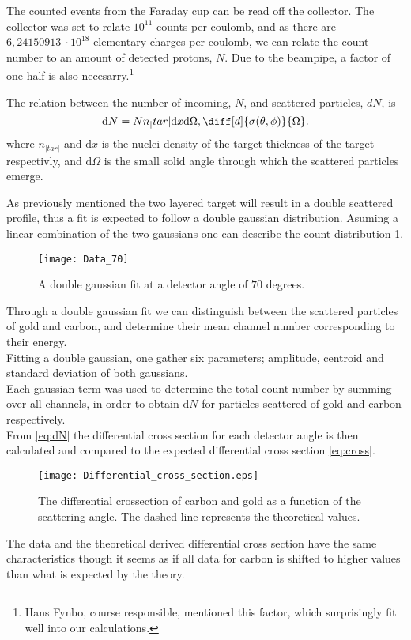 The counted events from the Faraday cup can be read off the collector. 
The collector was set to relate $10^{11}$ counts per coulomb, and as there are
$6,24150913\ \cdot10^{18}$ elementary
charges per coulomb, we can relate the count number to an amount of detected
protons, $N$. Due to the beampipe, a factor of one half is also
necesarry.\footnote{Hans Fynbo, course responsible, mentioned this factor,
    which surprisingly fit well into our calculations.}

The relation between the number of incoming, $N$, and scattered particles, $dN$, is
\begin{equation}\label{eq:dN}
    \mathrm{d}N = N n_|tar| \mathrm{d}x \mathrm{d}\Omega,
    \diff[d]{\sigma(\theta,\phi)}{\Omega}.
\end{equation}
\parencite[eq. 14.42, p. 582]{taylor} where $n_|tar|$ and $\mathrm{d}x$ is the
nuclei density of the target thickness of the target respectivly, and
$\mathrm{d}\Omega$ is the small solid angle through which the scattered
particles emerge.

As previously mentioned  the two layered target will result in a double
scattered profile, thus a fit is expected to follow a double gaussian
distribution. Asuming a linear combination of the two gaussians one can
describe the count distribution \cref{fig_doublegauss}.\\
\begin{figure}[h]
\centering
\texttt{[image: Data\_70]}
\caption{A double gaussian fit at a detector angle of $70$ degrees.}
\label{fig_doublegauss}
\end{figure}
Through a double gaussian fit we can distinguish between the scattered particles of gold and carbon, and determine their mean channel number corresponding to their energy.  \\
Fitting a double gaussian, one gather six parameters; amplitude, centroid and standard deviation
of both gaussians.  \\
Each gaussian term was used to determine the total count number by summing over
all channels, in order to obtain $\mathrm{d}N$ for particles scattered of gold
and carbon respectively.\\
%
From \cref{eq:dN} the differential cross section for each detector angle is
then calculated and compared to the expected differential cross section
\cref{eq:cross}.\\
\begin{figure}[b]
	\centering
		\texttt{[image: Differential\_cross\_section.eps]}
	\caption{The differential crossection  of carbon and gold as a function of the scattering angle. The dashed line represents the theoretical values.}
	\label{fig:Differential_cross_section}
\end{figure}
The data and the theoretical derived differential cross section have the same
characteristics though it seems as if all data for carbon is shifted to higher
values than what is expected by the theory.

